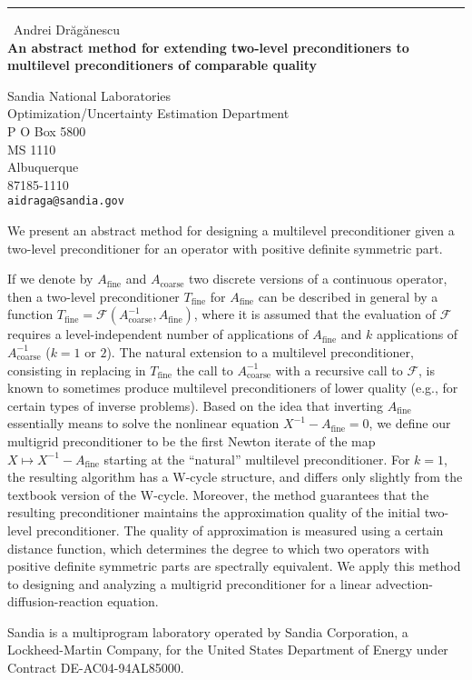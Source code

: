 \documentclass{report}
\begin{document}
\begin{center}
\rule{6in}{1pt} \
{\large Andrei Dr{\u a}g{\u a}nescu \\
{\bf An abstract method for extending two-level preconditioners to multilevel preconditioners of comparable quality}}

Sandia National Laboratories \\ Optimization/Uncertainty Estimation Department \\ P O Box 5800 \\ MS 1110 \\ Albuquerque \\ 87185-1110
\\
{\tt aidraga@sandia.gov}\end{center}

We present an abstract method for designing a multilevel preconditioner
given a two-level preconditioner for an operator with positive definite
symmetric part.

If we denote by $A_{\mathrm{fine}}$ and $A_{\mathrm{coarse}}$ two
discrete versions of a continuous operator, then a two-level
preconditioner $T_{\mathrm{fine}}$ for $A_{\mathrm{fine}}$ can be
described in general by a function $T_{\mathrm{fine}} = {\mathcal
F}(A_{\mathrm{coarse}}^{-1}, A_{\mathrm{fine}})$, where it is assumed
that the evaluation of ${\mathcal F}$ requires a level-independent number
of applications of $A_{\mathrm{fine}}$ and $k$ applications of
$A_{\mathrm{coarse}}^{-1}$ ($k=1$ or $2$). The natural extension to a
multilevel preconditioner, consisting in replacing in $T_{\mathrm{fine}}$
the call to $A_{\mathrm{coarse}}^{-1}$ with a recursive call to
${\mathcal F}$, is known to sometimes produce multilevel preconditioners
of lower quality (e.g., for certain types of inverse problems). Based on
the idea that inverting $A_{\mathrm{fine}}$ essentially means to solve
the nonlinear equation \mbox{$X^{-1} - A_{\mathrm{fine}}= 0$}, we define
our multigrid preconditioner to be the first Newton iterate of the map
$X\mapsto X^{-1} - A_{\mathrm{fine}}$ starting at the ``natural''
multilevel preconditioner. For $k=1$, the resulting algorithm has a
W-cycle structure, and differs only slightly from the textbook version of
the W-cycle. Moreover, the method guarantees that the resulting
preconditioner maintains the approximation quality of the initial
two-level preconditioner. The quality of approximation is measured using
a certain distance function, which determines the degree to which two
operators with positive definite symmetric parts are spectrally
equivalent. We apply this method to designing and analyzing a multigrid
preconditioner for a linear advection-diffusion-reaction equation.


{\small Sandia is a multiprogram laboratory operated by Sandia
Corporation, a Lockheed-Martin Company, for the United States Department
of Energy under Contract DE-AC04-94AL85000.}
\end{document}
